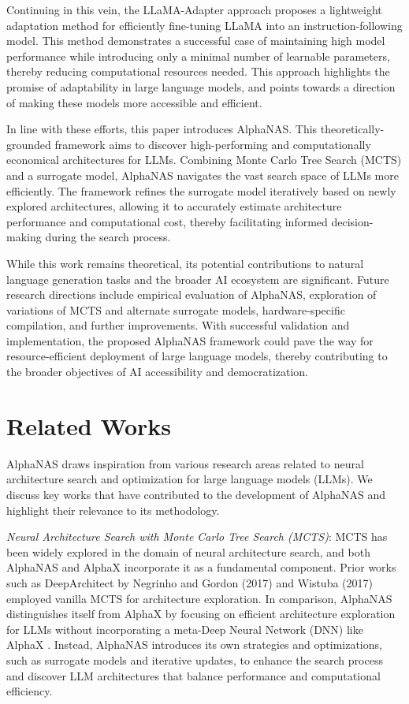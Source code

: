 \documentclass{article}
\begin{document}
Continuing in this vein, the LLaMA-Adapter approach \cite{zhang2023llamaadapter} proposes a lightweight adaptation method for efficiently fine-tuning LLaMA into an instruction-following model. This method demonstrates a successful case of maintaining high model performance while introducing only a minimal number of learnable parameters, thereby reducing computational resources needed. This approach highlights the promise of adaptability in large language models, and points towards a direction of making these models more accessible and efficient.

In line with these efforts, this paper introduces AlphaNAS. This theoretically-grounded framework aims to discover high-performing and computationally economical architectures for LLMs. Combining Monte Carlo Tree Search (MCTS) and a surrogate model, AlphaNAS navigates the vast search space of LLMs more efficiently. The framework refines the surrogate model iteratively based on newly explored architectures, allowing it to accurately estimate architecture performance and computational cost, thereby facilitating informed decision-making during the search process.

While this work remains theoretical, its potential contributions to natural language generation tasks and the broader AI ecosystem are significant. Future research directions include empirical evaluation of AlphaNAS, exploration of variations of MCTS and alternate surrogate models, hardware-specific compilation, and further improvements. With successful validation and implementation, the proposed AlphaNAS framework could pave the way for resource-efficient deployment of large language models, thereby contributing to the broader objectives of AI accessibility and democratization.


\section{Related Works}

AlphaNAS draws inspiration from various research areas related to neural architecture search and optimization for large language models (LLMs). We discuss key works that have contributed to the development of AlphaNAS and highlight their relevance to its methodology.

\textit{Neural Architecture Search with Monte Carlo Tree Search (MCTS)}: MCTS has been widely explored in the domain of neural architecture search, and both AlphaNAS and AlphaX incorporate it as a fundamental component. Prior works such as DeepArchitect by Negrinho and Gordon (2017) and Wistuba (2017) employed vanilla MCTS for architecture exploration. In comparison, AlphaNAS distinguishes itself from AlphaX by focusing on efficient architecture exploration for LLMs without incorporating a meta-Deep Neural Network (DNN) like AlphaX \cite{wang2019neural, wang2019alphax}. Instead, AlphaNAS introduces its own strategies and optimizations, such as surrogate models and iterative updates, to enhance the search process and discover LLM architectures that balance performance and computational efficiency.
\end{document}
